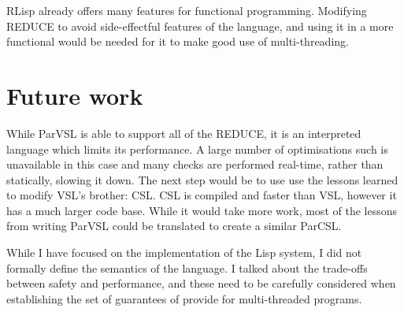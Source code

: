 RLisp already offers many features for functional programming.
Modifying REDUCE to avoid side-effectful features of the language, and using it in a more
functional would be needed for it to make good use of multi-threading.

\section{Future work}

While ParVSL is able to support all of the REDUCE, it is an interpreted language
which limits its performance. A large number of optimisations such is unavailable in this
case and many checks are performed real-time, rather than statically, slowing it down.
The next step would be to use use the lessons learned to modify VSL's brother: CSL.
CSL is compiled and faster than VSL, however it has a much larger code base.
While it would take more work, most of the lessons from writing ParVSL could be translated
to create a similar ParCSL.

While I have focused on the implementation of the Lisp system, I did not formally define
the semantics of the language. I talked about the trade-offs between safety and performance,
and these need to be carefully considered when establishing the set of guarantees of
provide for multi-threaded programs.

